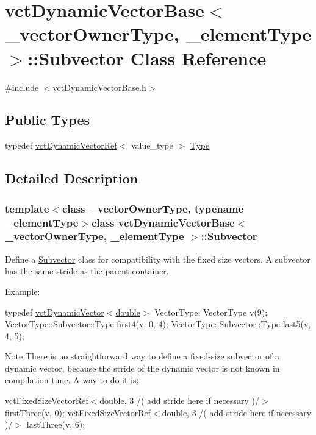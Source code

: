 \hypertarget{classvct_dynamic_vector_base_1_1_subvector}{}\section{vct\+Dynamic\+Vector\+Base$<$ \+\_\+vector\+Owner\+Type, \+\_\+element\+Type $>$\+:\+:Subvector Class Reference}
\label{classvct_dynamic_vector_base_1_1_subvector}


{\ttfamily \#include $<$vct\+Dynamic\+Vector\+Base.\+h$>$}

\subsection*{Public Types}
\begin{DoxyCompactItemize}
\item 
typedef \hyperlink{classvct_dynamic_vector_ref}{vct\+Dynamic\+Vector\+Ref}$<$ value\+\_\+type $>$ \hyperlink{classvct_dynamic_vector_base_1_1_subvector_a39712115ee3599cf1d241395f1ec645a}{Type}
\end{DoxyCompactItemize}


\subsection{Detailed Description}
\subsubsection*{template$<$class \+\_\+vector\+Owner\+Type, typename \+\_\+element\+Type$>$class vct\+Dynamic\+Vector\+Base$<$ \+\_\+vector\+Owner\+Type, \+\_\+element\+Type $>$\+::\+Subvector}

Define a \hyperlink{classvct_dynamic_vector_base_1_1_subvector}{Subvector} class for compatibility with the fixed size vectors. A subvector has the same stride as the parent container.

Example\+:

typedef \hyperlink{classvct_dynamic_vector}{vct\+Dynamic\+Vector$<$double$>$} Vector\+Type; Vector\+Type v(9); Vector\+Type\+::\+Subvector\+::\+Type first4(v, 0, 4); Vector\+Type\+::\+Subvector\+::\+Type last5(v, 4, 5);

\begin{DoxyNote}{Note}
There is no straightforward way to define a fixed-\/size subvector of a dynamic vector, because the stride of the dynamic vector is not known in compilation time. A way to do it is\+:
\end{DoxyNote}
\hyperlink{classvct_fixed_size_vector_ref}{vct\+Fixed\+Size\+Vector\+Ref}$<$double, 3 /( add stride here if necessary )/$>$ first\+Three(v, 0); \hyperlink{classvct_fixed_size_vector_ref}{vct\+Fixed\+Size\+Vector\+Ref}$<$double, 3 /( add stride here if necessary )/$>$ last\+Three(v, 6); 

